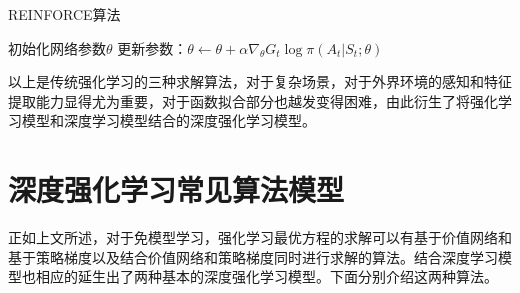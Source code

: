 \begin{algorithm}
	\caption{REINFORCE算法}
	\label{algo:REINFORCE}
	\begin{algorithmic}[1] %
		\State 初始化网络参数$ \theta$ 
		\State 更新参数：$ \theta  \leftarrow \theta  + \alpha {\nabla _\theta }{G_t}\log \pi ({A_t}|{S_t};\theta )$
		\EndFor
		\EndFor
	\end{algorithmic}
\end{algorithm}

以上是传统强化学习的三种求解算法，对于复杂场景，对于外界环境的感知和特征提取能力显得尤为重要，对于函数拟合部分也越发变得困难，由此衍生了将强化学习模型和深度学习模型结合的深度强化学习模型。
\section{深度强化学习常见算法模型}
正如上文所述，对于免模型学习，强化学习最优方程的求解可以有基于价值网络和基于策略梯度以及结合价值网络和策略梯度同时进行求解的算法。结合深度学习模型也相应的延生出了两种基本的深度强化学习模型。下面分别介绍这两种算法。
